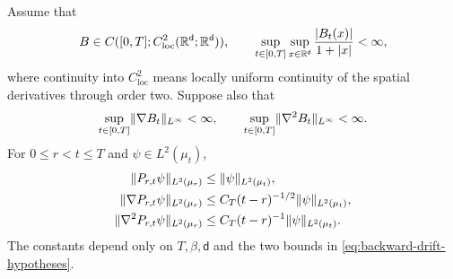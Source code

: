 \documentclass[11pt,reqno]{amsart}
\numberwithin{equation}{section}
\theoremstyle{plain}
\theoremstyle{remark}
\DeclarePairedDelimiter{\norm}{\lVert}{\rVert}
\renewcommand{\d}{\mathsf{d}}\newcommand{\s}{\mathsf{s}}
\begin{document}
\begin{lemma}\label{lem:backward-smoothing}
Assume that
\begin{equation}\label{eq:backward-regularity-growth}
 B\in C([0,T];C_{\mathrm{loc}}^2(\R^\d;\R^\d)),\qquad
 \sup_{t\in[0,T]}\sup_{x\in\R^\d}\frac{|B_t(x)|}{1+|x|}<\infty,
\end{equation}
where continuity into $C_{\mathrm{loc}}^2$ means locally uniform continuity of the spatial derivatives through order two. Suppose also that
\begin{equation}\label{eq:backward-drift-hypotheses}
 \sup_{t\in[0,T]}\norm{\nabla B_t}_{L^\infty}<\infty,\qquad
 \sup_{t\in[0,T]}\norm{\nabla^2B_t}_{L^\infty}<\infty.
\end{equation}
For $0\le r<t\le T$ and $\psi\in L^2(\mu_t)$,
\begin{align}
 \norm{P_{r,t}\psi}_{L^2(\mu_r)}&\le\norm\psi_{L^2(\mu_t)},
 \label{eq:backward-smoothing}\\
 \norm{\nabla P_{r,t}\psi}_{L^2(\mu_r)}&\le C_T(t-r)^{-1/2}\norm\psi_{L^2(\mu_t)},
 \label{eq:backward-gradient}\\
 \norm{\nabla^2P_{r,t}\psi}_{L^2(\mu_r)}&\le C_T(t-r)^{-1}\norm\psi_{L^2(\mu_t)}.
 \label{eq:backward-hessian}
\end{align}
The constants depend only on $T,\beta,\d$ and the two bounds in \eqref{eq:backward-drift-hypotheses}.
\end{lemma}
\end{document}
